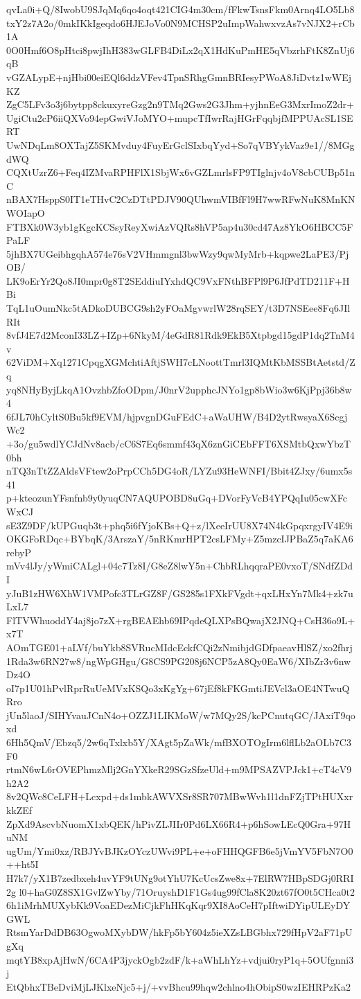 qvLa0i+Q/8IwobU9SJqMq6qo4oqt421CIG4m30cm/fFkwTsnsFkm0Arnq4LO5Lb8
txY2z7A2o/0mkIKkIgeqdo6HJEJoVo0N9MCHSP2uImpWahwxvzAs7vNJX2+rCb1A
0O0Hmf6O8pHtci8pwjIhH383wGLFB4DiLx2qX1HdKuPmHE5qVbzrhFtK8ZnUj6qB
vGZALypE+njHbi00eiEQl6ddzVFev4TpnSRhgGmnBRIesyPWoA8JiDvtz1wWEjKZ
ZgC5LFv3o3j6bytpp8ckuxyreGzg2n9TMq2Gws2G3Jhm+yjhnEeG3MxrImoZ2dr+
UgiCtu2cP6iiQXVo94epGwiVJoMYO+mupcTfIwrRajHGrFqqbjfMPPUAcSL1SERT
UwNDqLm8OXTajZ5SKMvduy4FuyErGclSIxbqYyd+So7qVBYykVaz9e1//8MGgdWQ
CQXtUzrZ6+Feq4IZMvaRPHFlX1SbjWx6vGZLmrlsFP9TIglnjv4oV8cbCUBp51nC
nBAX7HsppS0IT1eTHvC2CzDTtPDJV90QUhwmVIBfFl9H7wwRFwNuK8MnKNWOIapO
FTBXk0W3yb1gKgcKCSsyReyXwiAzVQRs8hVP5ap4u30cd47Az8YkO6HBCC5FPaLF
5jhBX7UGeibhgqhA574e76sV2VHmmgnl3bwWzy9qwMyMrb+kqpwe2LaPE3/PjOB/
LK9oErYr2Qo8JI0mpr0g8T2SEddiuIYxhdQC9VxFNthBFPl9P6JfPdTD211F+HBi
TqL1uOumNkc5tADkoDUBCG9sh2yFOaMgvwrlW28rqSEY/t3D7NSEee8Fq6JIlRIt
8vfJ4E7d2MconI33LZ+IZp+6NkyM/4eGdR81Rdk9EkB5Xtpbgd15gdP1dq2TnM4v
62ViDM+Xq1271CpqgXGMchtiAftjSWH7cLNoottTmrl3IQMtKbMSSBtAetstd/Zq
yq8NHyByjLkqA1OvzhbZfoODpm/J0nrV2upphcJNYo1gp8bWio3w6KjPpj36b8w4
6fJL70hCyltS0Bu5kf9EVM/hjpvgnDGuFEdC+aWaUHW/B4D2ytRwsyaX6ScgjWc2
+3o/gu5wdlYCJdNv8acb/cC6S7Eq6smmf43qX6znGiCEbFFT6XSMtbQxwYbzT0bh
nTQ3nTtZZAldsVFtew2oPrpCCh5DG4oR/LYZu93HeWNFI/Bbit4ZJxy/6umx5s41
p+kteozunYFsnfnb9y0yuqCN7AQUPOBD8uGq+DVorFyVcB4YPQqIu05cwXFcWxCJ
sE3Z9DF/kUPGuqb3t+phq5i6fYjoKBs+Q+z/lXeeIrUU8X74N4kGpqxrgyIV4E9i
OKGFoRDqc+BYbqK/3ArszaY/5nRKmrHPT2csLFMy+Z5mzcIJPBaZ5q7aKA6rebyP
mVv4lJy/yWmiCALgl+04c7Tz8I/G8eZ8lwY5n+ChbRLhqqraPE0vxoT/SNdfZDdI
yJuB1zHW6XhW1VMPofc3TLrGZ8F/GS285s1FXkFVgdt+qxLHxYn7Mk4+zk7uLxL7
FlTVWhuoddY4aj8jo7zX+rgBEAEhb69IPqdeQLXPsBQwajX2JNQ+CsH36o9L+x7T
AOmTGE01+aLVf/buYkb8SVRucMIdcEckfCQi2zNmibjdGDfpaeavHlSZ/xo2fhrj
1Rda3w6RN27w8/ngWpGHgu/G8CS9PG208j6NCP5zA8Qy0EaW6/XIbZr3v6nwDz4O
oI7p1U01hPvlRprRuUeMVxKSQo3xKgYg+67jEf8kFKGmtiJEVcl3aOE4NTwuQRro
jUn5laoJ/SIHYvauJCnN4o+OZZJ1LIKMoW/w7MQy2S/kcPCnutqGC/JAxiT9qoxd
6Hh5QmV/Ebzq5/2w6qTxlxb5Y/XAgt5pZaWk/mfBXOTOgIrm6lflLb2aOLb7C3F0
rtmN6wL6rOVEPhmzMlj2GnYXkeR29SGzSfzeUld+m9MPSAZVPJck1+cT4cV9h2A2
8v2QWc8CeLFH+Lcxpd+ds1mbkAWVXSr8SR707MBwWvh1l1dnFZjTPtHUXxrkkZEf
ZpXd9AscvbNuomX1xbQEK/hPivZLJIIr0Pd6LX66R4+p6hSowLEcQ0Gra+97HuNM
ugUm/Ymi0xz/RBJYvBJKzOYczUWvi9PL+e+oFHHQGFB6e5jVmYV5FbN7O0++ht5I
H7k7/yX1B7zedbxeh4uvYF9tUNg9otYhU7KcUcsZwe8x+7ElRW7HBpSDGj0RRI2g
l0+haG0Z8SX1GvlZwYby/71OruyshD1F1Gs4ug99fCla8K20zt67fO0t5CHca0t2
6h1iMrhMUXybKk9VoaEDezMiCjkFhHKqKqr9XI8AoCeH7pIftwiDYipULEyDYGWL
RtsmYarDdDB63OgwoMXybDW/hkFp5bY604z5ieXZsLBGbhx729fHpV2aF71pUgXq
mqtYB8xpAjHwN/6CA4P3jyckOgb2zdF/k+aWhLhYz+vdjui0ryP1q+5OUfgnni3j
EtQbhxTBeDviMjLJKlxeNjc5+j/+vvBhcu99hqw2chlno4hObipS0wzIEHRPzKa2
